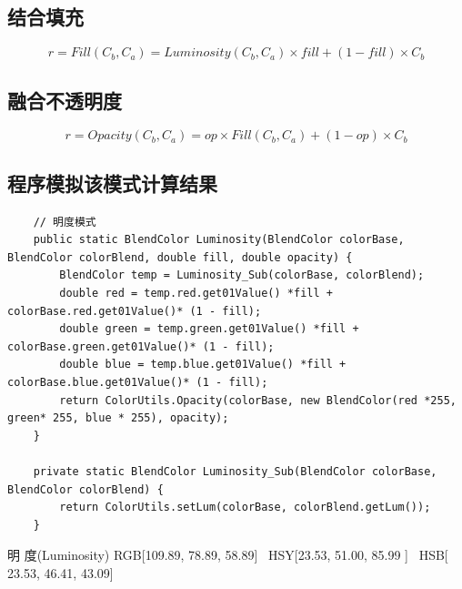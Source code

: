 \subsection{ 结合填充}

\begin{equation}r=Fill(C_b,C_a)= Luminosity(C_b,C_a) \times fill + (1-fill)\times C_b\end{equation}

\subsection{ 融合不透明度}

\begin{equation}r=Opacity(C_b,C_a)=op\times Fill(C_b,C_a)+(1-op)\times C_b\end{equation}

\subsection{ 程序模拟该模式计算结果}

\begin{lstlisting}
	// 明度模式
	public static BlendColor Luminosity(BlendColor colorBase, BlendColor colorBlend, double fill, double opacity) {
		BlendColor temp = Luminosity_Sub(colorBase, colorBlend);
		double red = temp.red.get01Value() *fill + colorBase.red.get01Value()* (1 - fill);
		double green = temp.green.get01Value() *fill + colorBase.green.get01Value()* (1 - fill);
		double blue = temp.blue.get01Value() *fill + colorBase.blue.get01Value()* (1 - fill);
		return ColorUtils.Opacity(colorBase, new BlendColor(red *255, green* 255, blue * 255), opacity);
	}
	
	private static BlendColor Luminosity_Sub(BlendColor colorBase, BlendColor colorBlend) {
		return ColorUtils.setLum(colorBase, colorBlend.getLum());
	}
\end{lstlisting}
\begin{result}
\item 明    度(Luminosity)    RGB[109.89,  78.89,  58.89]~ HSY[23.53,  51.00,  85.99 ]~ HSB[ 23.53,  46.41,  43.09]
\end{result}
\newpage
